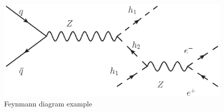 \documentclass{article}
\begin{document}
\begin{figure}
    \centering
    \includegraphics[width=0.5\linewidth]{Feynmann_Diagrams/pp-h1h2-ee.eps}
    \caption{Feynmann diagram example}
    \label{fig:enter-label}
\end{figure}
\end{document}

